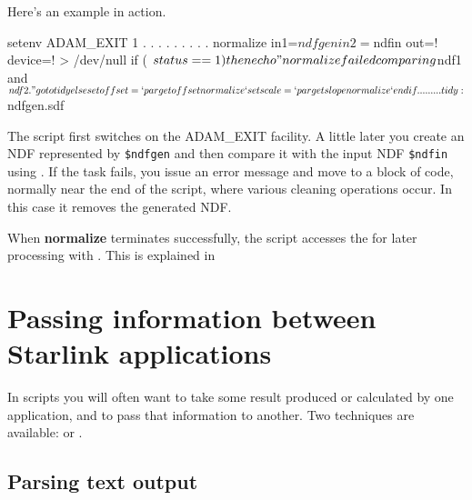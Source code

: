 \documentclass[twoside,11pt,nolof]{starlink}
\begin{document}
Here's an example in action.
\begin{small}
\begin{terminalv}
     setenv ADAM_EXIT 1
         .    .    .
         .    .    .
         .    .    .
     normalize in1=$ndfgen in2=$ndfin out=! device=! > /dev/null
     if ( $status == 1 ) then
        echo "normalize failed comparing $ndf1 and $ndf2."
        goto tidy
     else
        set offset = `parget offset normalize`
        set scale = `parget slope normalize`
     endif
         .    .    .
         .    .    .
         .    .    .
     tidy:
     \rm ${ndfgen}.sdf
\end{terminalv}
\end{small}

The script first switches on the ADAM\_EXIT facility.  A little later
you create an NDF represented by \texttt{\$ndfgen} and then compare it with
the input NDF \texttt{\$ndfin} using .
If the task fails, you issue an error message and move to a block of
code, normally near the end of the script, where various cleaning
operations occur.  In this case it removes the generated NDF.

When \textbf{normalize} terminates successfully, the script accesses the
 for later processing
with .  This is explained in
\begin{htmlonly}
\end{htmlonly}

\newpage
\section{Passing information between
Starlink applications\label{sc4_se_passing_info}}

In scripts you will often want to take some result produced or
calculated by one application, and to pass that information to another.
Two techniques are available:  or
.

\subsection{Parsing text output
\label{sc4_se_info_parse}}
\end{document}
